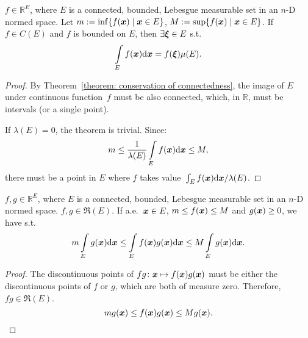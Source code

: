 \documentclass[openany]{book}
\begin{document}
\begin{theorem}
	\label{theorem: first mean-value theorem for the integral}
	$f \in \mathbb R^E$, where $E$ is a connected, bounded, Lebesgue measurable set in an $n$-D normed space. 
	Let $m := \inf\{f(\boldsymbol{x}) \mid \boldsymbol{x} \in E\}$, $M := \sup\{f(\boldsymbol{x}) \mid \boldsymbol{x} \in E\}$.
	If $f \in C(E)$ and $f$ is bounded on $E$, then $\exists \boldsymbol{\xi} \in E$ s.t.\ 
	\begin{equation*}
		\int\limits_E f(\boldsymbol{x}) \mathrm{d} \boldsymbol{x} = f(\boldsymbol{\xi}) \mu(E).
	\end{equation*}
\end{theorem}
\begin{proof}
	By Theorem~\ref{theorem: conservation of connectedness}, the image of $E$ under continuous function~$f$ must be also connected, which, in $\mathbb R$, must be intervals (or a single point).

	If $\lambda(E) = 0$, the theorem is trivial. 
	Since:
	\begin{equation*}
		m \leq \frac{1}{\lambda (E)} \int\limits_E f(\boldsymbol{x}) \mathrm{d} \boldsymbol{x} \leq M, 
	\end{equation*}
	there must be a point in $E$ where $f$ takes value~$\int_E f(\boldsymbol{x}) \mathrm{d} \boldsymbol{x} / \lambda(E)$.
\end{proof}

\begin{theorem}
	\label{theorem: mean-value theorem for the integral}
	$f, g \in \mathbb R^E$, where $E$ is a connected, bounded, Lebesgue measurable set in an $n$-D normed space. 
	$f, g \in \mathfrak R(E)$. 
	If a.e.\ $\boldsymbol{x} \in E$, $m \leq f(\boldsymbol{x}) \leq M$ and $g(\boldsymbol{x}) \geq 0$, we have
	s.t.\ 
	\begin{equation*}
		m \int\limits_E g(\boldsymbol{x}) \mathrm{d} \boldsymbol{x} 
			\leq \int\limits_E f(\boldsymbol{x}) g(\boldsymbol{x})\mathrm{d} \boldsymbol{x} 
			\leq M \int\limits_E g(\boldsymbol{x}) \mathrm{d} \boldsymbol{x}.
	\end{equation*}
\end{theorem}
\begin{proof}
	The discontinuous points of $fg \colon \boldsymbol{x} \mapsto f(\boldsymbol{x})g(\boldsymbol{x})$ must be either the discontinuous points of $f$ or $g$, which are both of measure zero. Therefore, $fg \in \mathfrak R(E)$.
	\begin{equation*}
		m g(\boldsymbol{x}) \leq f(\boldsymbol{x}) g(\boldsymbol{x}) \leq M g(\boldsymbol{x}).
	\end{equation*}
\end{proof}
\end{document}
